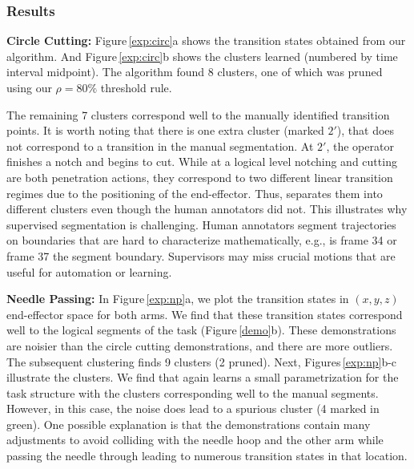 \subsubsection{Results}\label{results:real}

\noindent\textbf{Circle Cutting: }
Figure\,\ref{exp:circ}a shows the transition states obtained from our algorithm. And Figure\,\ref{exp:circ}b shows the \tsc clusters learned (numbered by time interval midpoint).
The algorithm found 8 clusters, one of which was pruned using our $\rho=80\%$ threshold rule.

The remaining 7 clusters correspond well to the manually identified transition points.
It is worth noting that there is one extra cluster (marked $2'$), that does not correspond to a transition in the manual segmentation.
At $2'$, the operator finishes a notch and begins to cut.
While at a logical level notching and cutting are both penetration actions, they correspond to two different linear transition regimes due to the positioning of the end-effector.
Thus, \tsc separates them into different clusters even though the human annotators did not.
This illustrates why supervised segmentation is challenging.
Human annotators segment trajectories on boundaries that are hard to characterize mathematically, e.g., is frame 34 or frame 37 the segment boundary.
Supervisors may miss crucial motions that are useful for automation or learning.





\noindent\textbf{Needle Passing: } 
In Figure\,\ref{exp:np}a, we plot the transition states in $(x,y,z)$ end-effector space for both arms.
We find that these transition states correspond well to the logical segments of the task (Figure\,\ref{demo}b).
These demonstrations are noisier than the circle cutting demonstrations, and there are more outliers.
The subsequent clustering finds 9 clusters (2 pruned).
Next, Figures\,\ref{exp:np}b-c illustrate the \tsc clusters.
We find that again \tsc learns a small parametrization for the task structure with the clusters corresponding well to the manual segments.
However, in this case, the noise does lead to a spurious cluster (4 marked in green).
One possible explanation is that the demonstrations contain many adjustments to avoid colliding with the needle hoop and the other arm while passing the needle through leading to numerous transition states in that location.


